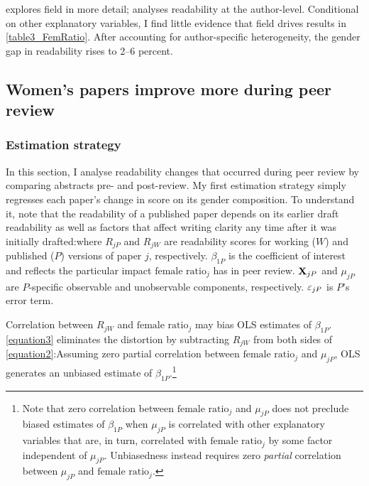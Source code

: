  explores field in more detail;  analyses readability at the author-level. Conditional on other explanatory variables, I find little evidence that field drives results in \autoref{table3_FemRatio}. After accounting for author-specific heterogeneity, the gender gap in readability rises to 2--6 percent.

\subsection{Women's papers improve more during peer review}
\label{nber}

\subsubsection{Estimation strategy}
\label{nberidentification}

In this section, I analyse readability changes that occurred during peer review by comparing abstracts pre- and post-review. My first estimation strategy simply regresses each paper's change in score on its gender composition. To understand it, note that the readability of a published paper depends on its earlier draft readability as well as factors that affect writing clarity any time after it was initially drafted:where $R_{jP}$ and $R_{jW}$ are readability scores for working ($W$) and published ($P$) versions of paper $j$, respectively. $\beta_{1P}$ is the coefficient of interest and reflects the particular impact $\text{female ratio}_j$ has in peer review. $\mathbf{X}_{jP}$ and $\mu_{jP}$ are $P$-specific observable and unobservable components, respectively. $\varepsilon_{jP}$ is $P$'s error term.

Correlation between $R_{jW}$ and $\text{female ratio}_j$ may bias OLS estimates of $\beta_{1P}$. \autoref{equation3} eliminates the distortion by subtracting $R_{jW}$ from both sides of \autoref{equation2}:Assuming zero partial correlation between $\text{female ratio}_j$ and $\mu_{jP}$, OLS generates an unbiased estimate of $\beta_{1P}$.\footnote{\label{FootnoteColliders}Note that zero correlation between $\text{female ratio}_j$ and $\mu_{jP}$ does not preclude biased estimates of $\beta_{1P}$ when $\mu_{jP}$ is correlated with other explanatory variables that are, in turn, correlated with $\text{female ratio}_j$ by some factor independent of $\mu_{jP}$. Unbiasedness instead requires zero \emph{partial} correlation between $\mu_{jP}$ and $\text{female ratio}_j$.}

